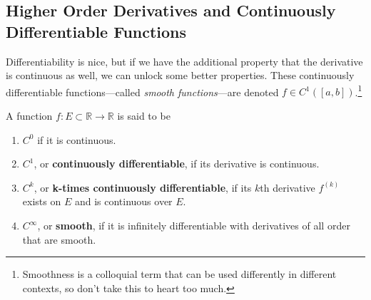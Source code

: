 \begin{example}
\begin{center}
    \end{center}
  \end{example}

\subsection{Higher Order Derivatives and Continuously Differentiable Functions}

  Differentiability is nice, but if we have the additional property that the derivative is continuous as well, we can unlock some better properties. These continuously differentiable functions---called \textit{smooth functions}---are denoted $f \in C^1([a, b])$.\footnote{Smoothness is a colloquial term that can be used differently in different contexts, so don't take this to heart too much.} 

  \begin{definition}[$C^k$ Functions]
    \label{def:ck-func}
    A function $f: E \subset \mathbb{R} \to \mathbb{R}$ is said to be 
    \begin{enumerate}
      \item $C^0$ if it is continuous. 
      \item $C^1$, or \textbf{continuously differentiable}, if its derivative is continuous.
      \item $C^k$, or \textbf{k-times continuously differentiable}, if its $k$th derivative $f^{(k)}$ exists on $E$ and is continuous over $E$. 
      \item $C^\infty$, or \textbf{smooth}, if it is infinitely differentiable with derivatives of all order that are smooth. 
    \end{enumerate}
  \end{definition}

